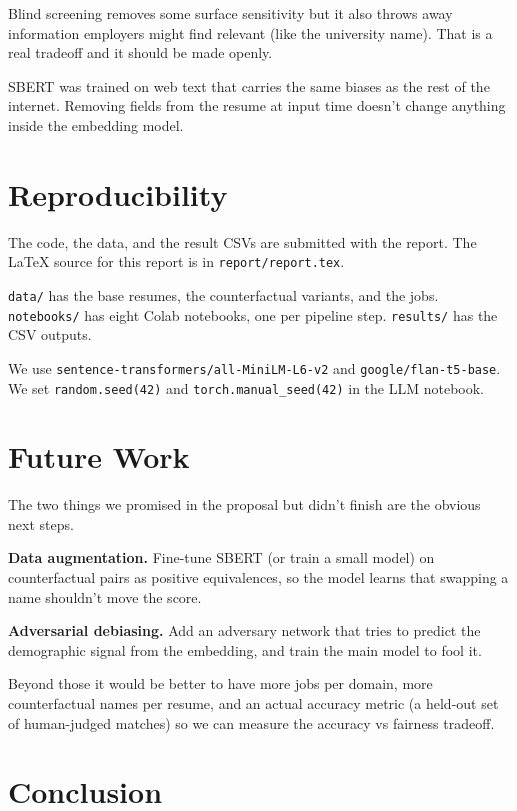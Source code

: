 \documentclass{article}
\begin{document}
Blind screening removes some surface sensitivity but it also throws away information employers might find relevant (like the university name). That is a real tradeoff and it should be made openly.

SBERT was trained on web text that carries the same biases as the rest of the internet. Removing fields from the resume at input time doesn't change anything inside the embedding model.

\section{Reproducibility}

The code, the data, and the result CSVs are submitted with the report. The LaTeX source for this report is in \texttt{report/report.tex}.

\texttt{data/} has the base resumes, the counterfactual variants, and the jobs. \texttt{notebooks/} has eight Colab notebooks, one per pipeline step. \texttt{results/} has the CSV outputs.

We use \texttt{sentence-transformers/all-MiniLM-L6-v2} and \texttt{google/flan-t5-base}. We set \texttt{random.seed(42)} and \texttt{torch.manual\_seed(42)} in the LLM notebook.

\section{Future Work}
\label{sec:future}

The two things we promised in the proposal but didn't finish are the obvious next steps.

\textbf{Data augmentation.} Fine-tune SBERT (or train a small model) on counterfactual pairs as positive equivalences, so the model learns that swapping a name shouldn't move the score.

\textbf{Adversarial debiasing.} Add an adversary network that tries to predict the demographic signal from the embedding, and train the main model to fool it.

Beyond those it would be better to have more jobs per domain, more counterfactual names per resume, and an actual accuracy metric (a held-out set of human-judged matches) so we can measure the accuracy vs fairness tradeoff.

\section{Conclusion}
\end{document}
